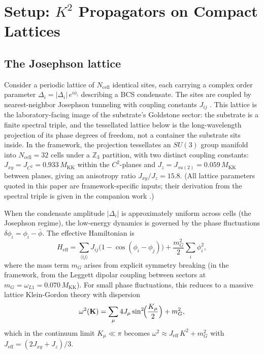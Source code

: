 \documentclass[12pt]{article}
\theoremstyle{definition}
\theoremstyle{remark}
\begin{document}
\section{Setup: \texorpdfstring{$K^2$}{K\texttwosuperior} Propagators on Compact Lattices}\label{sec:setup}

\subsection{The Josephson lattice}

Consider a periodic lattice of $N_{\mathrm{cell}}$ identical sites, each carrying a complex order parameter $\Delta_i = |\Delta_i|\, e^{i\phi_i}$ describing a BCS condensate. The sites are coupled by nearest-neighbor Josephson tunneling with coupling constants $J_{ij}$ \citep{BCS1957,Josephson1962}. This lattice is the laboratory-facing image of the substrate's Goldstone sector: the substrate is a finite spectral triple, and the tessellated lattice below is the long-wavelength projection of its phase degrees of freedom, not a container the substrate sits inside. In the framework, the projection tessellates an $SU(3)$ group manifold into $N_{\mathrm{cell}} = 32$ cells under a $\mathbb{Z}_3$ partition, with two distinct coupling constants: $J_{xy} = J_{C^2} = 0.933\,M_{\mathrm{KK}}$ within the $C^2$-planes and $J_z = J_{su(2)} = 0.059\,M_{\mathrm{KK}}$ between planes, giving an anisotropy ratio $J_{xy}/J_z = 15.8$. (All lattice parameters quoted in this paper are framework-specific inputs; their derivation from the spectral triple is given in the companion work \citep{PhononExflation}.)

When the condensate amplitude $|\Delta_i|$ is approximately uniform across cells (the Josephson regime), the low-energy dynamics is governed by the phase fluctuations $\delta\phi_i = \phi_i - \bar{\phi}$. The effective Hamiltonian is
\begin{equation}\label{eq:Josephson-H}
  H_{\mathrm{eff}} = \sum_{\langle ij \rangle} J_{ij}\bigl(1 - \cos(\phi_i - \phi_j)\bigr) + \frac{m_G^2}{2}\sum_i \phi_i^2,
\end{equation}
where the mass term $m_G$ arises from explicit symmetry breaking (in the framework, from the Leggett dipolar coupling between sectors at $m_G = \omega_{L1} = 0.070\,M_{\mathrm{KK}}$). For small phase fluctuations, this reduces to a massive lattice Klein-Gordon theory with dispersion
\begin{equation}\label{eq:dispersion}
  \omega^2(\mathbf{K}) = \sum_{\mu} 4 J_\mu \sin^2\!\Bigl(\frac{K_\mu}{2}\Bigr) + m_G^2,
\end{equation}
which in the continuum limit $K_\mu \ll \pi$ becomes $\omega^2 \approx J_{\mathrm{eff}}\, K^2 + m_G^2$ with $J_{\mathrm{eff}} = (2J_{xy} + J_z)/3$.
\end{document}
